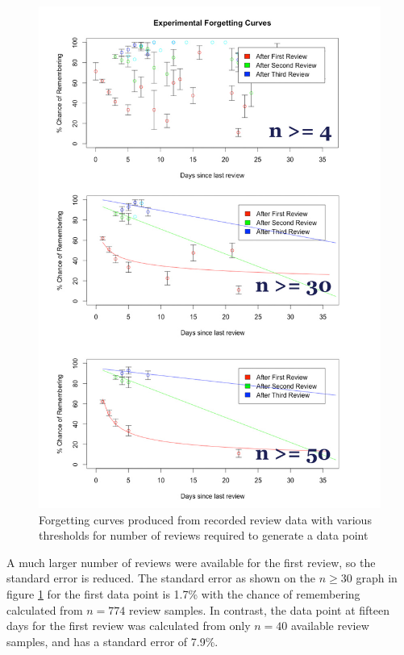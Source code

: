\begin{figure}[h!]
\includegraphics[width=14cm]{img/forgettingcurves.jpg}
\caption{Forgetting curves produced from recorded review data with various thresholds
for number of reviews required to generate a data point}
\label{fig_expforgetcurve}
\end{figure}

A much larger number of reviews were available for the first review, so the standard error
is reduced. The standard error as shown on the $n \geq 30$
graph in figure \ref{fig_expforgetcurve} for the first
data point is 1.7\% with the chance of remembering calculated from $n = 774$ review samples.
In contrast, the data point at fifteen days for the first review was calculated from only 
$n = 40$ available review samples, and has a standard error of 7.9\%.

